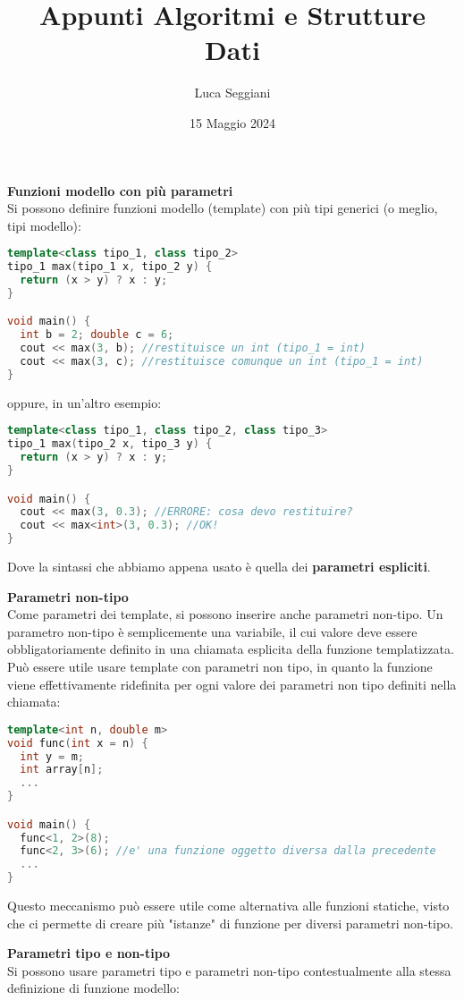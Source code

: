 \documentclass[a4paper,12pt]{article}
\title{Appunti Algoritmi e Strutture Dati}
\author{Luca Seggiani}
\date{15 Maggio 2024}
\begin{document}
\maketitle
\par\smallskip
\textbf{Funzioni modello con più parametri} \\
Si possono definire funzioni modello (template) con più tipi generici (o meglio, tipi modello):
\begin{lstlisting}[language=C++]
template<class tipo_1, class tipo_2>
tipo_1 max(tipo_1 x, tipo_2 y) {
  return (x > y) ? x : y;
}

void main() {
  int b = 2; double c = 6;
  cout << max(3, b); //restituisce un int (tipo_1 = int)
  cout << max(3, c); //restituisce comunque un int (tipo_1 = int)
}
\end{lstlisting}
oppure, in un'altro esempio:
\begin{lstlisting}[language=C++]
template<class tipo_1, class tipo_2, class tipo_3>
tipo_1 max(tipo_2 x, tipo_3 y) {
  return (x > y) ? x : y;
}

void main() {
  cout << max(3, 0.3); //ERRORE: cosa devo restituire?
  cout << max<int>(3, 0.3); //OK!
}
\end{lstlisting}
Dove la sintassi che abbiamo appena usato è quella dei \textbf{parametri espliciti}.
\par\smallskip
\textbf{Parametri non-tipo} \\
Come parametri dei template, si possono inserire anche parametri non-tipo. Un parametro non-tipo è semplicemente
una variabile, il cui valore deve essere obbligatoriamente definito in una chiamata esplicita della funzione templatizzata.
Può essere utile usare template con parametri non tipo, in quanto la funzione viene effettivamente ridefinita per ogni
valore dei parametri non tipo definiti nella chiamata:
\begin{lstlisting}[language=C++]
template<int n, double m>
void func(int x = n) {
  int y = m;
  int array[n];
  ...
}

void main() {
  func<1, 2>(8);
  func<2, 3>(6); //e' una funzione oggetto diversa dalla precedente
  ...
}
\end{lstlisting}
Questo meccanismo può essere utile come alternativa alle funzioni statiche, visto che ci permette di creare più "istanze" di funzione
per diversi parametri non-tipo.
\par\smallskip
\textbf{Parametri tipo e non-tipo} \\
Si possono usare parametri tipo e parametri non-tipo contestualmente alla stessa definizione di funzione modello:
\end{document}
